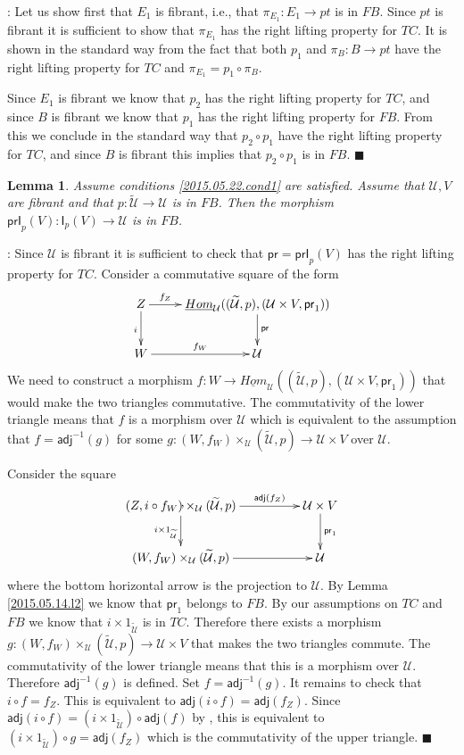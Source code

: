 \documentclass[12pt]{article}
\numberwithin{equation}{section}
\newenvironment{myproof}{{\bf Proof}:}{$\blacksquare$ \vskip 5mm }
\newtheorem{lemma}[proposition]{Lemma}
\newcommand{\sr}{\rightarrow}
\newcommand{\uu}{\underline}
\newcommand{\iHom}{\uu{Hom}}
\newcommand{\wt}{\widetilde}
\newcommand{\id}{1}            %
\newcommand{\U}{\mathcal{U}}
\newcommand{\I}{\mathsf{I}}
\newcommand{\pr}{\mathsf{pr}}
\newcommand{\prI}{\mathsf{prI}}
\newcommand{\adj}{\mathsf{adj}}
\begin{document}
%
\begin{myproof}
Let us show first that $E_1$ is fibrant, i.e., that $\pi_{E_1}:E_1\sr pt$ is in
$FB$. Since $pt$ is fibrant it is sufficient to show that $\pi_{E_1}$ has the
right lifting property for $TC$. It is shown in the standard way from the fact
that both $p_1$ and $\pi_B:B\sr pt$ have the right lifting property for $TC$
and $\pi_{E_1}=p_1\circ \pi_B$.

Since $E_1$ is fibrant we know that $p_2$ has the right lifting property for
$TC$, and since $B$ is fibrant we know that $p_1$ has the right lifting property
for $FB$. From this we conclude in the standard way that $p_2\circ p_1$ have
the right lifting property for $TC$, and since $B$ is fibrant this implies that
$p_2\circ p_1$ is in $FB$.
\end{myproof}
%
\begin{lemma}
  \label{2015.05.14.l1}
  Assume conditions \ref{2015.05.22.cond1} are satisfied.
  Assume that $\U,V$ are fibrant and that $p:\wt{\U}\sr \U$
  is in $FB$. Then the morphism $\prI_p(V):\I_p(V)\sr \U$ is in $FB$.
\end{lemma}
%
\begin{myproof}
Since $\U$ is fibrant it is sufficient to check that $\pr=\prI_p(V)$ has the right
lifting property for $TC$. Consider a commutative square of the form
%
$$
\begin{xy}
          \xymatrix@C=2pc{ Z \ar[r]^-{f_Z} \ar[d]_{i} &
            \iHom_\U((\wt{\U},p),(\U\times V,\pr_1)) \ar[d]^{\pr}\\ W
            \ar[r]^-{f_W} & \U }
\end{xy}
$$
%
We need to construct a morphism $f:W\sr \iHom_\U((\wt{\U},p),(\U\times
V,\pr_1))$ that would make the two triangles commutative. The commutativity of
the lower triangle means that $f$ is a morphism over $\U$ which is equivalent to
the assumption that $f=\adj^{-1}(g)$ for some $g:(W,f_W)\times_\U (\wt{\U},p)\sr
\U\times V$ over $\U$.

Consider the square
%
$$
\begin{xy}
          \xymatrix@C=4pc{ (Z, i\circ f_W)\times_\U (\wt{\U},p)
            \ar[r]^-{\adj(f_Z)} \ar[d]_{i\times \id_{\wt{\U}}} & \U\times V
            \ar[d]^{\pr_1}\\ (W,f_W)\times_\U (\wt{\U},p) \ar[r] & \U },
\end{xy}
$$
where the bottom horizontal arrow is the projection to $\U$.
%
By Lemma \ref{2015.05.14.l2} we know that $\pr_1$ belongs to $FB$. By our
assumptions on $TC$ and $FB$ we know that $i\times \id_{\wt{\U}}$ is in
$TC$. Therefore there exists a morphism $g:(W,f_W)\times_\U (\wt{\U},p) \sr
\U\times V$ that makes the two triangles commute.  The commutativity of the
lower triangle means that this is a morphism over $\U$. Therefore $\adj^{-1}(g)$
is defined. Set $f=\adj^{-1}(g)$. It remains to check that $i\circ f=f_Z$. This
is equivalent to $\adj(i\circ f)=\adj(f_Z)$. Since $\adj(i\circ f)=(i\times
\id_{\wt{\U}})\circ \adj(f)$ by \cite[Lemma 8.7(3)]{fromunivwithPi}, this is
equivalent to $(i\times \id_{\wt{\U}})\circ g=\adj(f_Z)$ which is the
commutativity of the upper triangle.
\end{myproof}
\end{document}

